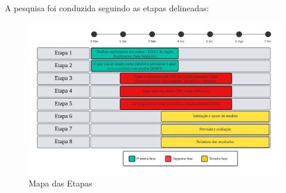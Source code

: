 A pesquisa foi conduzida seguindo as etapas delineadas:

\begin{figure}[!htpb]
	\centering
	\caption{Mapa das Etapas}
	\label{fig:etapas}
	\includegraphics[width=1\linewidth]{Introducao/Figuras/Etapas}
	
\end{figure}

